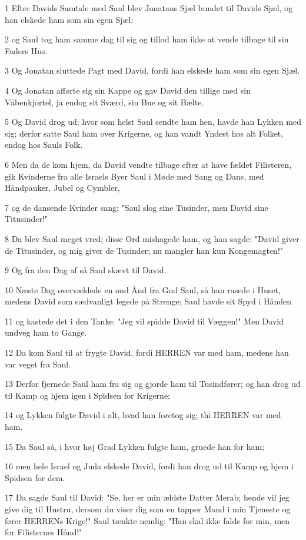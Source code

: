 \par 1 Efter Davids Samtale med Saul blev Jonatans Sjæl bundet til Davids Sjæl, og han elskede ham som sin egen Sjæl;
\par 2 og Saul tog ham samme dag til sig og tillod ham ikke at vende tilbage til sin Faders Hus.
\par 3 Og Jonatan sluttede Pagt med David, fordi han elskede ham som sin egen Sjæl.
\par 4 Og Jonatan afførte sig sin Kappe og gav David den tillige med sin Våbenkjortel, ja endog sit Sværd, sin Bue og sit Bælte.
\par 5 Og David drog ud; hvor som helst Saul sendte ham hen, havde han Lykken med sig; derfor satte Saul ham over Krigerne, og han vandt Yndest hos alt Folket, endog hos Sauls Folk.
\par 6 Men da de kom hjem, da David vendte tilbage efter at have fældet Filisteren, gik Kvinderne fra alle Israels Byer Saul i Møde med Sang og Dans, med Håndpauker, Jubel og Cymbler,
\par 7 og de dansende Kvinder sang: "Saul slog sine Tusinder, men David sine Titusinder!"
\par 8 Da blev Saul meget vred; disse Ord mishagede ham, og han sagde: "David giver de Titusinder, og mig giver de Tusinder; nu mangler han kun Kongemagten!"
\par 9 Og fra den Dag af så Saul skævt til David.
\par 10 Næste Dag overvældede en ond Ånd fra Gud Saul, så han rasede i Huset, medens David som sædvanligt legede på Strenge; Saul havde sit Spyd i Hånden
\par 11 og kastede det i den Tanke: "Jeg vil spidde David til Væggen!" Men David undveg ham to Gange.
\par 12 Da kom Saul til at frygte David, fordi HERREN var med ham, medens han var veget fra Saul.
\par 13 Derfor fjernede Saul ham fra sig og gjorde ham til Tusindfører; og han drog ud til Kamp og hjem igen i Spidsen for Krigerne;
\par 14 og Lykken fulgte David i alt, hvad han foretog sig; thi HERREN var med ham.
\par 15 Da Saul så, i hvor høj Grad Lykken fulgte ham, gruede han for ham;
\par 16 men hele Israel og Juda elskede David, fordi han drog ud til Kamp og hjem i Spidsen for dem.
\par 17 Da sagde Saul til David: "Se, her er min ældste Datter Merab; hende vil jeg give dig til Hustru, dersom du viser dig som en tapper Mand i min Tjeneste og fører HERRENs Krige!" Saul tænkte nemlig: "Han skal ikke falde for min, men for Filisternes Hånd!"
